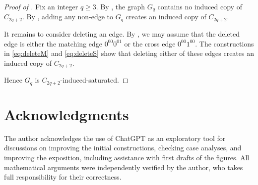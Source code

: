 \documentclass[11pt]{article}
\theoremstyle{definition}
\theoremstyle{remark}
\begin{document}
\begin{proof}[Proof of ]
Fix an integer $q\ge3$.
By , the graph $G_q$ contains no induced copy of
$C_{2q+2}$.
By , adding any non-edge to $G_q$ creates an induced copy of
$C_{2q+2}$.

It remains to consider deleting an edge.
By , we may assume that the deleted edge is either the matching edge $0^{00}0^{01}$ or the cross edge $0^{00}1^{00}$.
The constructions in \eqref{eq:deleteM} and \eqref{eq:deleteS} show that deleting either of these edges creates an induced copy of $C_{2q+2}$.

Hence $G_q$ is $C_{2q+2}$-induced-saturated.
\end{proof}

\section*{Acknowledgments}
The author acknowledges the use of ChatGPT as an exploratory tool for
discussions on improving the initial constructions, checking case analyses,
and improving the exposition, including assistance with  first drafts of the figures.
All mathematical arguments were independently verified by the author,
who takes full responsibility for their correctness.


%
%
\end{document}
